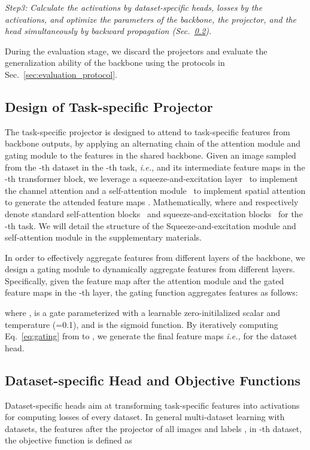 \documentclass[10pt,twocolumn,letterpaper]{article}
\begin{document}
\emph{Step3:} \emph{Calculate the activations by dataset-specific heads, losses by the activations, and optimize the parameters of the backbone, the projector, and the head simultaneously by backward propagation (Sec.~\ref{sec:loss}).}

During the evaluation stage, we discard the projectors and evaluate the generalization ability of the backbone  using the protocols in Sec.~\ref{sec:evaluation_protocol}.





\subsection{Design of Task-specific Projector} \label{sec:projector_design}
The task-specific projector is designed to attend to task-specific features from backbone outputs, by applying an alternating chain of the attention module and gating module to the features in the shared backbone. Given an image  sampled from the -th dataset in the -th task, \emph{i.e.,}  and its intermediate feature maps  in the -th transformer block, we leverage a squeeze-and-excitation layer~\cite{hu2018squeeze} to implement the channel attention and a self-attention module~\cite{vaswani2017attention} to implement spatial attention to generate the attended feature maps . Mathematically, 
where  and  respectively denote standard self-attention blocks~\cite{vaswani2017attention} and squeeze-and-excitation blocks~\cite{hu2018squeeze} for the -th task. We will detail the structure of the Squeeze-and-excitation module and self-attention module in the supplementary materials.

In order to effectively aggregate features from different layers of the backbone, we design a gating module to dynamically aggregate features from different layers. Specifically, given the feature map  after the attention module and the gated feature maps  in the -th layer, the gating function aggregates features as follows:

where ,   is a gate parameterized with a learnable zero-initilalized scalar  and temperature (=0.1), and  is the sigmoid function. By iteratively computing Eq.~\ref{eq:gating} from  to , we generate the final feature maps \emph{i.e.,}  for the dataset head.  




\subsection{Dataset-specific Head and Objective Functions} \label{sec:loss}
Dataset-specific heads aim at transforming task-specific features into activations for computing losses of every dataset. In general multi-dataset learning with  datasets, the features  after the projector of all images  and labels ,  in -th dataset, the objective function is defined as 
\end{document}
